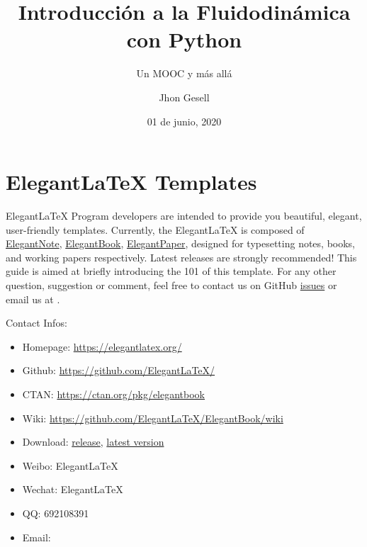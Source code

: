 \documentclass[11pt]{elegantbook}
\title{Introducción a la Fluidodinámica con Python}
\subtitle{Un MOOC y más allá}
\author{Jhon Gesell}
\institute{Navier Stokes Institute}
\date{01 de junio, 2020}
\begin{document}
\maketitle

\frontmatter
\tableofcontents

\mainmatter
\chapter{Elegant\LaTeX{} Templates}
Elegant\LaTeX{} Program developers are intended to provide you beautiful, elegant, user-friendly templates. Currently, the Elegant\LaTeX{} is composed of \href{https://github.com/ElegantLaTeX/ElegantNote}{ElegantNote}, \href{https://github.com/ElegantLaTeX/ElegantBook}{ElegantBook}, \href{https://github.com/ElegantLaTeX/ElegantPaper}{ElegantPaper}, designed for typesetting notes, books, and working papers respectively. Latest releases are strongly recommended! This guide is aimed at briefly introducing the 101 of this template. For any other question, suggestion or comment, feel free to contact us on GitHub \href{https://github.com/ElegantLaTeX/ElegantBook/issues}{issues} or email us at .

Contact Infos:
\begin{itemize}
  \item Homepage: \href{https://elegantlatex.org/}{https://elegantlatex.org/}
  \item Github: \href{https://github.com/ElegantLaTeX/}{https://github.com/ElegantLaTeX/}
  \item CTAN: \href{https://ctan.org/pkg/elegantbook}{https://ctan.org/pkg/elegantbook}
  \item Wiki: \href{https://github.com/ElegantLaTeX/ElegantBook/wiki}{https://github.com/ElegantLaTeX/ElegantBook/wiki}
  \item Download: \href{https://github.com/ElegantLaTeX/ElegantBook/releases}{release}, \href{https://github.com/ElegantLaTeX/ElegantBook/archive/master.zip}{latest version}
  \item Weibo: Elegant\LaTeX{}
  \item Wechat: Elegant\LaTeX{}
  \item QQ: 692108391
  \item Email: 
\end{itemize}
\end{document}
